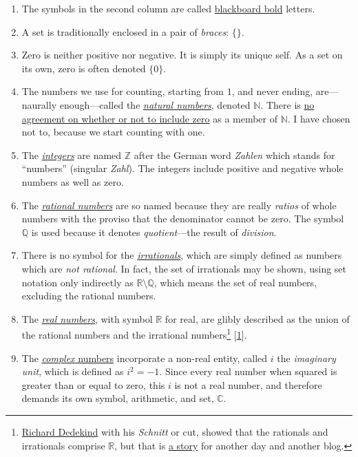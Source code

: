 \documentclass[
  a4paper,
]{article}
\begin{document}
\begin{enumerate}
\item
  The symbols in the second column are called
  \href{https://oeis.org/wiki/Blackboard_bold}{blackboard bold} letters.
\item
  A set is traditionally enclosed in a pair of \emph{braces}: \(\{\}\).
\item
  Zero is neither positive nor negative. It is simply its unique self.
  As a set on its own, zero is often denoted \(\{0\}\).
\item
  The numbers we use for counting, starting from \(1\), and never
  ending, are---naurally enough---called the
  \href{https://mathworld.wolfram.com/NaturalNumber.html}{\emph{natural
  numbers}}, denoted \(\mathbb{N}\). There is
  \href{https://en.wikipedia.org/wiki/Natural_number}{no agreement on
  whether or not to include zero} as a member of \(\mathbb{N}\). I have
  chosen not to, because we start counting with one.
\item
  The \href{https://en.wikipedia.org/wiki/Integer}{\emph{integers}} are
  named \(\mathbb{Z}\) after the German word \emph{Zahlen} which stands
  for ``numbers'' (singular \emph{Zahl}). The integers include positive
  and negative whole numbers as well as zero.
\item
  The
  \href{https://mathworld.wolfram.com/RationalNumber.html}{\emph{rational
  numbers}} are so named because they are really \emph{ratios} of whole
  numbers with the proviso that the denominator cannot be zero. The
  symbol \(\mathbb{Q}\) is used because it denotes \emph{quotient}---the
  result of \emph{division}.
\item
  There is no symbol for the
  \href{https://mathworld.wolfram.com/IrrationalNumber.html}{\emph{irrationals}},
  which are simply defined as numbers which are \emph{not rational}. In
  fact, the set of irrationals may be shown, using set notation only
  indirectly as \(\mathbb{R}\setminus\mathbb{Q}\), which means the set
  of real numbers, excluding the rational numbers.
\item
  The \href{https://en.wikipedia.org/wiki/Real_number}{\emph{real
  numbers}}, with symbol \(\mathbb{R}\) for real, are glibly described
  as the union of the rational numbers and the irrational
  numbers\footnote{\href{https://en.wikipedia.org/wiki/Richard_Dedekind}{Richard
    Dedekind} with his \emph{Schnitt} or cut, showed that the rationals
    and irrationals comprise \(\mathbb{R}\), but that is
    \href{https://arpita95b.medium.com/cutting-through-the-confusion-how-dedekind-cuts-build-the-real-numbers-20aeaaec021d}{a
    story} for another day and another blog.}
  {[}\protect\hyperlink{ref-arpita2023}{1}{]}.
\item
  The \href{https://en.wikipedia.org/wiki/Complex_number}{\emph{complex}
  numbers} incorporate a non-real entity, called \(i\) the
  \emph{imaginary unit}, which is defined as \(i^2 = -1\). Since every
  real number when squared is greater than or equal to zero, this \(i\)
  is not a real number, and therefore demands its own symbol,
  arithmetic, and set, \(\mathbb{C}\).
\end{enumerate}
\end{document}
